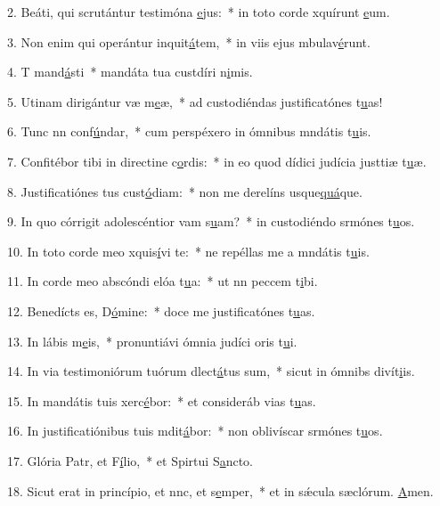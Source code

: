 2. Beáti, qui scrutántur testimóna \uline{e}jus:~* in toto corde xquírunt \uline{e}um.\par 
3. Non enim qui operántur inquit\uline{á}tem,~* in viis ejus mbulav\uline{é}runt.\par 
4. T mand\uline{á}sti~* mandáta tua custdíri n\uline{i}mis.\par 
5. Utinam dirigántur væ m\uline{e}æ,~* ad custodiéndas justificatónes t\uline{u}as!\par 
6. Tunc nn conf\uline{ú}ndar,~* cum perspéxero in ómnibus mndátis t\uline{u}is.\par 
7. Confitébor tibi in directine c\uline{o}rdis:~* in eo quod dídici judícia justtiæ t\uline{u}æ.\par 
8. Justificatiónes tus cust\uline{ó}diam:~* non me derelíns usque\uline{quá}que.\par 
9. In quo córrigit adolescéntior vam s\uline{u}am?~* in custodiéndo srmónes t\uline{u}os.\par 
10. In toto corde meo xquis\uline{í}vi te:~* ne repéllas me a mndátis t\uline{u}is.\par 
11. In corde meo abscóndi elóa t\uline{u}a:~* ut nn peccem t\uline{i}bi.\par 
12. Benedícts es, D\uline{ó}mine:~* doce me justificatónes t\uline{u}as.\par 
13. In lábis m\uline{e}is,~* pronuntiávi ómnia judíci oris t\uline{u}i.\par 
14. In via testimoniórum tuórum dlect\uline{á}tus sum,~* sicut in ómnibs divít\uline{i}is.\par 
15. In mandátis tuis xerc\uline{é}bor:~* et consideráb vias t\uline{u}as.\par 
16. In justificatiónibus tuis mdit\uline{á}bor:~* non oblivíscar srmónes t\uline{u}os.\par 
17. Glória Patr, et F\uline{í}lio,~* et Spirtui S\uline{a}ncto.\par 
18. Sicut erat in princípio, et nnc, et s\uline{e}mper,~* et in sǽcula sæclórum. \uline{A}men.\par 
